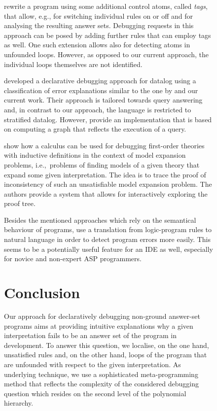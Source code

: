 \documentclass{tlp}
\newcommand{\iec}{i.e.,\ }
\begin{document}
\begin{figure}[t]
\begin{small}
 rewrite a program using some additional control
atoms, called \emph{tags}, that allow, e.g., for switching individual rules on or off and for analysing the resulting answer sets.
Debugging requests in this approach can be posed by adding further rules that can employ tags as well.
One such extension allows also for detecting atoms in unfounded loops.
However, as opposed to our current approach, the individual loops themselves are not identified.

 developed a declarative debugging approach for datalog
using a classification of error explanations similar to the one by  and our current work.
Their approach is tailored towards query answering  and,
in contrast to our approach, the language is restricted to stratified datalog. 
However,  provide an implementation that is based on computing
a graph that reflects the execution of a query.


 show how a calculus can be used for
debugging  first-order theories with inductive definitions in the context of model expansion problems, \iec problems of finding models of a given theory that expand some given interpretation. 
The idea is to trace the proof of inconsistency of such an unsatisfiable model expansion problem.
The authors provide a system that allows for interactively exploring the proof tree.

Besides the mentioned approaches which rely on the semantical behaviour of programs,  \citeyear{mirek07} use a translation from logic-program rules to natural language in order to detect program errors more easily.
This seems to be a potentially useful feature for an IDE as well, especially for novice and non-expert ASP programmers.

\section{Conclusion}


Our approach for declaratively debugging non-ground an\-swer-set programs
aims at providing intuitive explanations why a given interpretation fails to be an
answer set of the program in development.
To answer this question, we localise, on the one hand, unsatisfied rules
and, on the other hand, loops of the program that are unfounded with respect
to the given interpretation.
As underlying technique, we use a sophisticated meta-programming method
that reflects the complexity of the considered debugging question
which resides on the second level of the polynomial hierarchy.


\end{small}
\end{figure}
\end{document}
